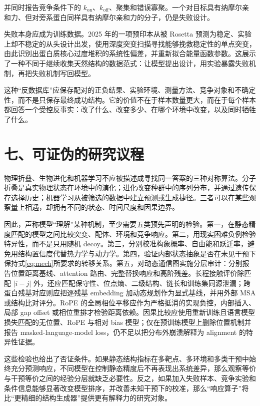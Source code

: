 \documentclass[10pt]{article}
\begin{document}
并同时报告竞争条件下的 $k_{\mathrm{on}}$、$k_{\mathrm{off}}$、聚集和错误寡聚。一个对目标具有纳摩尔亲和力、但对旁系蛋白同样具有纳摩尔亲和力的分子，仍是失败设计。

失败本身应成为训练数据。2025 年的一项预印本从被 Rosetta 预测为稳定、实验上却不稳定的从头设计出发，使用深度突变扫描寻找能够挽救稳定性的单点突变，由此识别出蛋白质核心过度堆积的系统性偏差，并重新拟合能量函数参数\cite{haddox2025}。这展示了一种不同于继续收集天然结构的数据范式：让模型提出设计，用实验暴露失败机制，再把失败机制写回模型。

这种“反数据库”应保存配对的正负结果、实验环境、测量方法、竞争对象和不确定性，而不是只保存\mbox{最终成功结构}。它的价值不在于样本数量更大，而在于每个样本都回答一个受控反事实：改了什么、改变多少、在哪个环境中改变，以及同时牺牲了什么。

\section*{七、可证伪的研究议程}

物理折叠、生物进化和机器学习不应被描述成寻找同一答案的三种对称算法。分子折叠是真实物理状态在环境中的演化；进化改变种群中的序列分布，并通过遗传保存选择历史；机器学习从被筛选的数据中建立预测或生成捷径。三者可以在某些观察量上相遇，却拥有不同的状态、时间尺度和因果边界。

因此，声称模型“理解”某种机制，至少需要五类预先声明的检验。第一，在静态精度匹配的模型之间比较突变、配体、环境和竞争响应。第二，用现实困难负例检验特异性，而不是只用随机 decoy。第三，分别校准构象概率、自由能和跃迁率，避免用结构置信度代替热力学与动力学。第四，验证内部状态抽象是否在未见干预下保持式\eqref{eq:mech}所要求的转移关系。第五，对动态通信图实施分层审计：分别报告位置距离基线、attention 路由、完整替换响应和高阶残差。长程接触评价除匹配 $|i-j|$ 外，还应匹配保守性、位点熵、二级结构、链长和训练集同源泄漏；跨蛋白残基对应则应把逐残基 embedding 加动态规划作为显式基线，并用外部 MSA 或结构比对评分。RoPE 的全局相位平移应作为严格抵消的实现负控，内部插入、局部 gap offset 或相位重排才检验距离依赖。因果比较应使用重新训练且语言模型损失匹配的无位置、RoPE 与相对 bias 模型；仅在预训练模型上删除位置机制并报告 masked-language-model loss，仍不足以把分布外崩溃解释为 alignment 的特异性证据。

这些检验也给出了否证条件。如果静态结构指标在多靶点、多环境和多类干预中始终充分预测响应，不同模型在控制静态精度后不再表现出系统差异，那么观察等价与干预等价之间的经验分层就缺乏必要性。反之，如果加入失败样本、竞争实验和条件信息能够显著改变模型排序，并改善未知干预下的校准，那么“响应算子”将比“更精细的结构生成器”提供更有解释力的研究对象。
\end{document}
